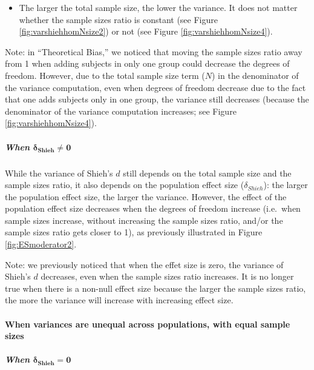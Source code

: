 \documentclass[
  english,
  man,mask]{apa6}
\providecommand{\tightlist}{%
  \setlength{\itemsep}{0pt}\setlength{\parskip}{0pt}}
\let\oldparagraph\paragraph
\renewcommand{\paragraph}[1]{\oldparagraph{#1}\mbox{}}
\let\oldsubparagraph\subparagraph
\renewcommand{\subparagraph}[1]{\oldsubparagraph{#1}\mbox{}}
\begin{document}
\begin{itemize}
\tightlist
\item
  The larger the total sample size, the lower the variance. It does not matter whether the sample sizes ratio is constant (see Figure \ref{fig:varshiehhomNsize2}) or not (see Figure \ref{fig:varshiehhomNsize4}).
\end{itemize}

Note: in ``Theoretical Bias,'' we noticed that moving the sample sizes ratio away from 1 when adding subjects in only one group could decrease the degrees of freedom. However, due to the total sample size term (\(N\)) in the denominator of the variance computation, even when degrees of freedom decrease due to the fact that one adds subjects only in one group, the variance still decreases (because the denominator of the variance computation increases; see Figure \ref{fig:varshiehhomNsize4}).

\hypertarget{when-bmdelta_shieh-neq-0}{%
\subparagraph{\texorpdfstring{When \(\bm{\delta_{Shieh} \neq 0}\)}{When \textbackslash bm\{\textbackslash delta\_\{Shieh\} \textbackslash neq 0\}}}\label{when-bmdelta_shieh-neq-0}}

While the variance of Shieh's \(d\) still depends on the total sample size and the sample sizes ratio, it also depends on the population effect size (\(\delta_{Shieh}\)): the larger the population effect size, the larger the variance. However, the effect of the population effect size decreases when the degrees of freedom increase (i.e.~when sample sizes increase, without increasing the sample sizes ratio, and/or the sample sizes ratio gets closer to 1), as previously illustrated in Figure \ref{fig:ESmoderator2}.

Note: we previously noticed that when the effet size is zero, the variance of Shieh's \(d\) decreases, even when the sample sizes ratio increases. It is no longer true when there is a non-null effect size because the larger the sample sizes ratio, the more the variance will increase with increasing effect size.

\hypertarget{when-variances-are-unequal-across-populations-with-equal-sample-sizes-4}{%
\paragraph{When variances are unequal across populations, with equal sample sizes}\label{when-variances-are-unequal-across-populations-with-equal-sample-sizes-4}}

\hypertarget{when-bmdelta_shieh-0-1}{%
\subparagraph{\texorpdfstring{When \(\bm{\delta_{Shieh} = 0}\)}{When \textbackslash bm\{\textbackslash delta\_\{Shieh\} = 0\}}}\label{when-bmdelta_shieh-0-1}}
\end{document}
